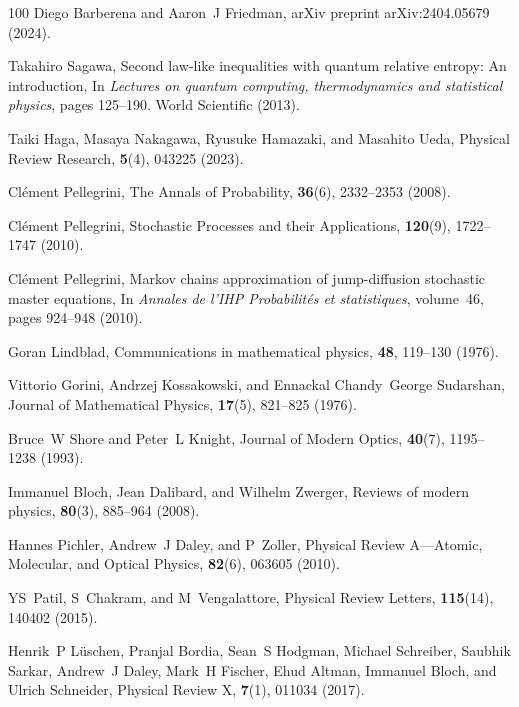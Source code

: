 \documentclass[preprint,pteplogo]{ptephy_v2}%
\numberwithin{equation}{section}
\theoremstyle{definition}
\begin{document}
\begin{thebibliography}{100}
Diego Barberena and Aaron~J Friedman, arXiv preprint arXiv:2404.05679 (2024).

Takahiro Sagawa,
\newblock Second law-like inequalities with quantum relative entropy: An introduction,
\newblock In {\em Lectures on quantum computing, thermodynamics and statistical physics}, pages 125--190. World Scientific (2013).

Taiki Haga, Masaya Nakagawa, Ryusuke Hamazaki, and Masahito Ueda, Physical Review Research, {\bf 5}(4), 043225 (2023).

Cl{\'e}ment Pellegrini, The Annals of Probability, {\bf 36}(6), 2332--2353 (2008).

Cl{\'e}ment Pellegrini, Stochastic Processes and their Applications, {\bf 120}(9), 1722--1747 (2010).

Cl{\'e}ment Pellegrini,
\newblock Markov chains approximation of jump-diffusion stochastic master equations,
\newblock In {\em Annales de l'IHP Probabilit{\'e}s et statistiques}, volume~46, pages 924--948 (2010).

Goran Lindblad, Communications in mathematical physics, {\bf 48}, 119--130 (1976).

Vittorio Gorini, Andrzej Kossakowski, and Ennackal Chandy~George Sudarshan, Journal of Mathematical Physics, {\bf 17}(5), 821--825 (1976).

Bruce~W Shore and Peter~L Knight, Journal of Modern Optics, {\bf 40}(7), 1195--1238 (1993).

Immanuel Bloch, Jean Dalibard, and Wilhelm Zwerger, Reviews of modern physics, {\bf 80}(3), 885--964 (2008).

Hannes Pichler, Andrew~J Daley, and P~Zoller, Physical Review A—Atomic, Molecular, and Optical Physics, {\bf 82}(6), 063605 (2010).

YS~Patil, S~Chakram, and M~Vengalattore, Physical Review Letters, {\bf 115}(14), 140402 (2015).

Henrik~P L{\"u}schen, Pranjal Bordia, Sean~S Hodgman, Michael Schreiber, Saubhik Sarkar, Andrew~J Daley, Mark~H Fischer, Ehud Altman, Immanuel Bloch, and Ulrich Schneider, Physical Review X, {\bf 7}(1), 011034 (2017).


\end{thebibliography}
\end{document}
